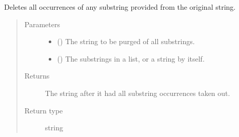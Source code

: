 \documentclass[letterpaper,10pt,english]{sphinxmanual}
\begin{document}
\begin{fulllineitems}
\label{\detokenize{docstrings/ifa_smeargle.core.string_formatting:ifa_smeargle.core.string_formatting.purge_substrings}}
Deletes all occurrences of any substring provided from the
original string.
\begin{quote}\begin{description}
\item[{Parameters}] \leavevmode\begin{itemize}
\item {} 
 () \textendash{} The string to be purged of all substrings.

\item {} 
 () \textendash{} The substrings in a list, or a string by itself.

\end{itemize}

\item[{Returns}] \leavevmode
{} \textendash{} The string after it had all substring occurrences taken out.

\item[{Return type}] \leavevmode
string

\end{description}\end{quote}

\end{fulllineitems}

\end{document}
